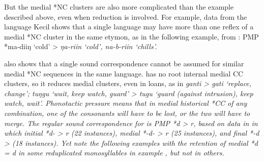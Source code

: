 But the medial *NC clusters are also more complicated than the
 example described above,
even when reduction is involved.
For example, data from the  language
 Kecil shows that a single language may have more than one
reflex of a medial *NC cluster in the same etymon,
as in the following example,
from \citet{Grimes1991a}: PMP *ma-diiŋ ‘cold’ >
\it{ŋa-riin} ‘cold’, \it{na-b-riin} ‘chills’.

 also shows that a single sound correspondence cannot be
assumed for similar medial *NC sequences in the same language.
 has no root internal medial CC clusters,
so it reduces medial clusters,
even in loans, as in  \it{ganti} >  \it{gati} ‘replace,
change’;  \it{tuŋgu} ‘wait,
keep watch, guard’ >  \it{tugu} ‘guard (against intrusion), keep watch, wait’.
Phonotactic pressure means that in medial historical *CC of any
combination, one of the consonants will have to be lost,
or the two will have to merge.
The regular sound correspondence for  is PMP *d > \it{r},
based on data in \citet{GrimesGrimes2020} in which initial
*d- > \it{r} (22 instances),
medial *-d- > \it{r} (25 instances),
and final *-d > {\0} (18 instances).
Yet note the following examples with the retention of medial
*d = \it{d} in some reduplicated monosyllables in example ,
but not in others.


